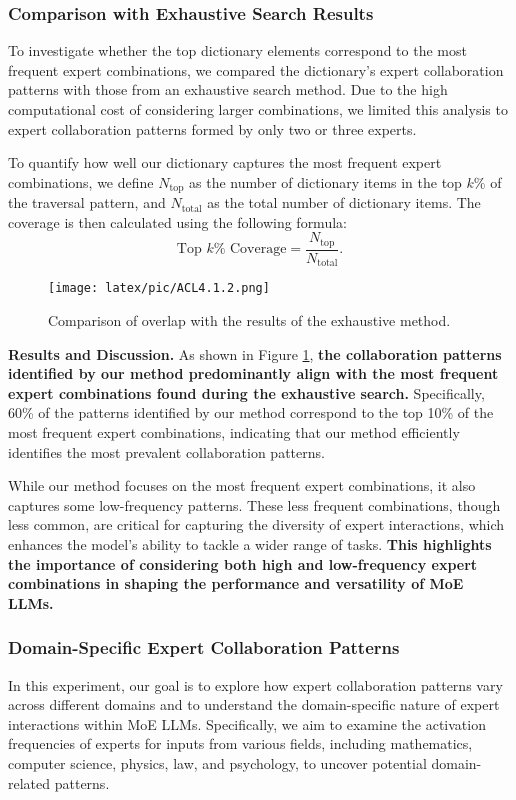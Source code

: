 \documentclass[11pt]{article}
\begin{document}
\subsubsection{Comparison with Exhaustive Search Results}

To investigate whether the top dictionary elements correspond to the most frequent expert combinations, we compared the dictionary's expert collaboration patterns with those from an exhaustive search method. Due to the high computational cost of considering larger combinations, we limited this analysis to expert collaboration patterns formed by only two or three experts.

To quantify how well our dictionary captures the most frequent expert combinations, we define \( N_{\text{top}} \) as the number of dictionary items in the top \( k\% \) of the traversal pattern, and \( N_{\text{total}} \) as the total number of dictionary items. The coverage is then calculated using the following formula:
\begin{equation}
\text{Top } k\% \text{ Coverage} = \frac{N_{\text{top}}}{N_{\text{total}}}.
\end{equation}

\begin{figure}[t]
    \centering
    \texttt{[image: latex/pic/ACL4.1.2.png]}
    \caption{Comparison of overlap with the results of the exhaustive method.}
    \label{comparision}
\end{figure}

\textbf{Results and Discussion.} As shown in Figure \ref{comparision}, \textbf{the collaboration patterns identified by our method predominantly align with the most frequent expert combinations found during the exhaustive search.} Specifically, 60\% of the patterns identified by our method correspond to the top 10\% of the most frequent expert combinations, indicating that our method efficiently identifies the most prevalent collaboration patterns.

While our method focuses on the most frequent expert combinations, it also captures some low-frequency patterns. These less frequent combinations, though less common, are critical for capturing the diversity of expert interactions, which enhances the model’s ability to tackle a wider range of tasks. \textbf{This highlights the importance of considering both high and low-frequency expert combinations in shaping the performance and versatility of MoE LLMs.}
 

\subsubsection{Domain-Specific Expert Collaboration Patterns}
In this experiment, our goal is to explore how expert collaboration patterns vary across different domains and to understand the domain-specific nature of expert interactions within MoE LLMs. Specifically, we aim to examine the activation frequencies of experts for inputs from various fields, including mathematics, computer science, physics, law, and psychology, to uncover potential domain-related patterns.
\end{document}
